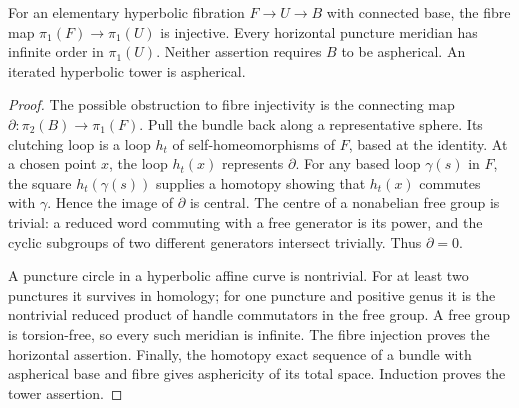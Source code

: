 \begin{theorem}\label{P3b-discrete}
For an elementary hyperbolic fibration $F\to U\to B$ with connected
base, the fibre map $\pi _1(F)\to\pi _1(U)$ is injective. Every
horizontal puncture meridian has infinite order in $\pi _1(U)$.
Neither assertion requires $B$ to be aspherical. An iterated
hyperbolic tower is aspherical.
\end{theorem}
\begin{proof}
The possible obstruction to fibre injectivity is the connecting map
$\partial:\pi _2(B)\to\pi _1(F)$. Pull the bundle back along a
representative sphere. Its clutching loop is a loop $h_t$ of
self-homeomorphisms of $F$, based at the identity. At a chosen point
$x$, the loop $h_t(x)$ represents $\partial$. For any based loop
$\gamma(s)$ in $F$, the square $h_t(\gamma(s))$ supplies a homotopy
showing that $h_t(x)$ commutes with $\gamma$. Hence the image of
$\partial$ is central. The centre of a nonabelian free group is
trivial: a reduced word commuting with a free generator is its
power, and the cyclic subgroups of two different generators
intersect trivially. Thus $\partial=0$.

A puncture circle in a hyperbolic affine curve is nontrivial.
For at least two punctures it survives in homology; for one
puncture and positive genus it is the nontrivial reduced product
of handle commutators in the free group. A free group is
torsion-free, so every such meridian is infinite. The fibre
injection proves the horizontal assertion. Finally, the homotopy
exact sequence of a bundle with aspherical base and fibre gives
asphericity of its total space. Induction proves the tower
assertion.
\end{proof}

